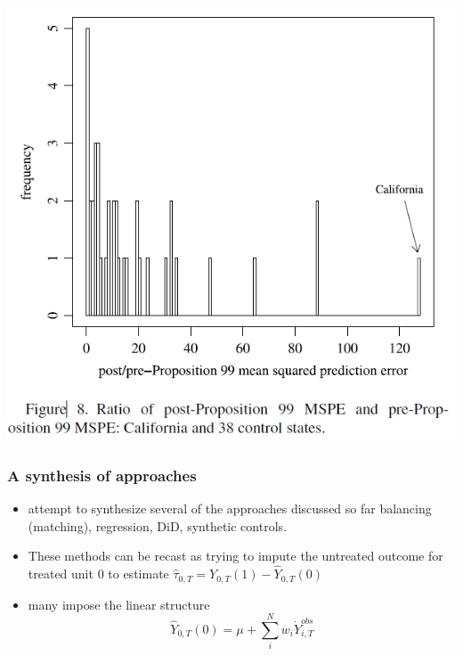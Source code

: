 \begin{frame}
  \frametitle{}
  \begin{center}
    \includegraphics[width=.9\textwidth]{./resources/ADHPredictionErrors}
  \end{center}  
\end{frame}


\begin{frame}
  \frametitle{A synthesis of approaches}
  \begin{itemize}
    \item \citet{DoudchenkoImbensSynth} attempt to synthesize several of the approaches discussed so far balancing (matching), regression, DiD, synthetic controls. 
    \item These methods can be recast as trying to impute the untreated outcome for treated unit $0$ to estimate $\hat \tau_{0,T} = Y_{0,T}(1) - \hat Y_{0,T}(0)$
    \item many impose the linear structure $$ \hat Y_{0,T}(0) = \mu + \sum_{i}^{N}w_i \dot Y_{i,T}^{obs} $$
  \end{itemize}
\end{frame}
    
